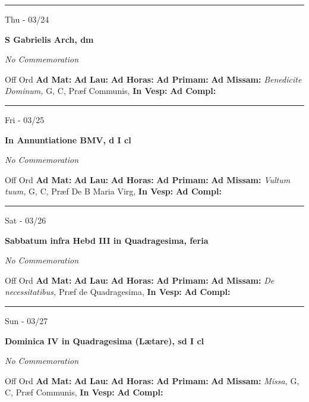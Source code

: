 \documentclass[letterpaper, 10pt]{article}
\begin{document}
\hrule
\begin{center}
Thu - 03/24
\end{center}\textbf{ \large S Gabrielis Arch, \textnormal{\normalsize dm}}

\textit{No Commemoration}\begin{justify}
Off Ord
\textbf{Ad Mat: }
\textbf{Ad Lau: }
\textbf{Ad Horas: }
\textbf{Ad Primam: }
\textbf{Ad Missam:} \textit{Benedicite Dominum, } G, C, Præf Communis, 
\textbf{In Vesp: }
\textbf{Ad Compl: }\end{justify}



\hrule
\begin{center}
Fri - 03/25
\end{center}\textbf{ \large In Annuntiatione BMV, \textnormal{\normalsize d I cl}}

\textit{No Commemoration}\begin{justify}
Off Ord
\textbf{Ad Mat: }
\textbf{Ad Lau: }
\textbf{Ad Horas: }
\textbf{Ad Primam: }
\textbf{Ad Missam:} \textit{Vultum tuum, } G, C, Præf De B Maria Virg, 
\textbf{In Vesp: }
\textbf{Ad Compl: }\end{justify}



\hrule
\begin{center}
Sat - 03/26
\end{center}\textbf{ \large Sabbatum infra Hebd III in Quadragesima, \textnormal{\normalsize feria}}

\textit{No Commemoration}\begin{justify}
Off Ord
\textbf{Ad Mat: }
\textbf{Ad Lau: }
\textbf{Ad Horas: }
\textbf{Ad Primam: }
\textbf{Ad Missam:} \textit{De necessitatibus, } Præf de Quadragesima, 
\textbf{In Vesp: }
\textbf{Ad Compl: }\end{justify}



\hrule
\begin{center}
Sun - 03/27
\end{center}\textbf{ \large Dominica IV in Quadragesima (Lætare), \textnormal{\normalsize sd I cl}}

\textit{No Commemoration}\begin{justify}
Off Ord
\textbf{Ad Mat: }
\textbf{Ad Lau: }
\textbf{Ad Horas: }
\textbf{Ad Primam: }
\textbf{Ad Missam:} \textit{Missa, } G, C, Præf Communis, 
\textbf{In Vesp: }
\textbf{Ad Compl: }\end{justify}
\end{document}
